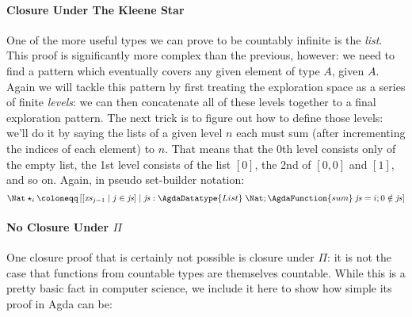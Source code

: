 \paragraph{Closure Under The Kleene Star}
One of the more useful types we can prove to be countably infinite is the
\emph{list}.
This proof is significantly more complex than the previous, however: we need to
find a pattern which eventually covers any given element of type
\;\(A\), given \AgdaFunction{\(\aleph\)!}\;\(A\).
Again we will tackle this pattern by first treating the exploration space as a
series of finite \emph{levels}: we can then concatenate all of these levels
together to a final exploration pattern.
The next trick is to figure out how to define those levels: we'll do it by
saying the lists of a given level \(n\) each must sum (after incrementing the
indices of each element) to \(n\).
That means that the 0th level consists only of the empty list, the 1st level
consists of the list \(\left[ 0 \right]\), the 2nd of \(\left[ 0 , 0
\right]\) and \(\left[ 1 \right]\), and so on.
Again, in pseudo set-builder notation:
\begin{equation*}
  \Nat\star_i \coloneqq \left[ \left[ \mathit{xs}_{j - 1} \mid j \in \mathit{js} \right] \mid \mathit{js} : \AgdaDatatype{List}\;\Nat ; \AgdaFunction{sum}\;\mathit{js} = i ; 0 \notin \mathit{js}  \right]
\end{equation*}
\paragraph{No Closure Under \(\Pi\)}
One closure proof that is certainly not possible is closure under \(\Pi\):
it is not the case that functions from countable types are themselves countable.
While this is a pretty basic fact in computer science, we include it here to
show how simple its proof in Agda can be:
\begin{agdalisting*}
\end{agdalisting*}

